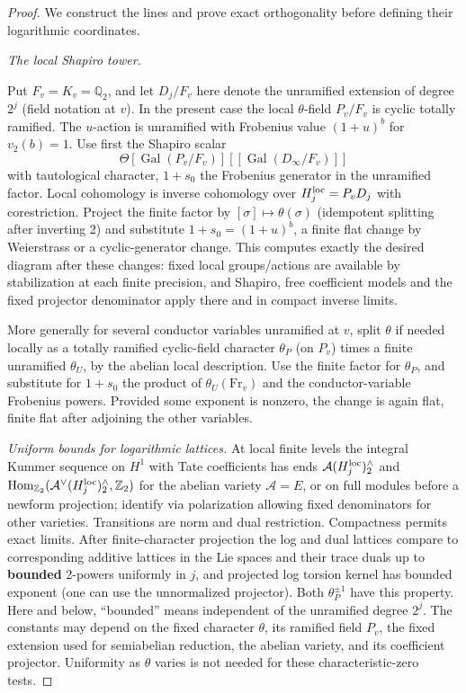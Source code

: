 \begin{proof}
We construct the lines and prove exact orthogonality before defining their logarithmic coordinates.

\smallskip\noindent\emph{The local Shapiro tower.}

Put \(F_v=K_v=\mathbb Q_2\), and let \(D_j/F_v\) here denote the unramified extension of degree \(2^j\) (field notation at \(v\)). In the present case the local \(\theta\)-field \(P_v/F_v\) is cyclic totally ramified. The \(u\)-action is unramified with Frobenius value \((1+u)^b\) for \(v_2(b)=1\). Use first the Shapiro scalar
\[
          \Theta[\operatorname{Gal}(P_v/F_v)]
                        [[\operatorname{Gal}(D_\infty/F_v)]]
\]
with tautological character, \(1+s_0\) the Frobenius generator in the unramified factor. Local cohomology is inverse cohomology over \(H_j^{\rm loc}=P_vD_j\) with corestriction. Project the finite factor by \([\sigma]\mapsto\theta(\sigma)\) (idempotent splitting after inverting 2) and substitute \(1+s_0=(1+u)^b\), a finite flat change by Weierstrass or a cyclic-generator change. This computes exactly the desired diagram after these changes: fixed local groups/actions are available by stabilization at each finite precision, and Shapiro, free coefficient models and the fixed projector denominator apply there and in compact inverse limits.

More generally for several conductor variables unramified at \(v\), split \(\theta\) if needed locally as a totally ramified cyclic-field character \(\theta_P\) (on \(P_v\)) times a finite unramified \(\theta_U\), by the abelian local description. Use the finite factor for \(\theta_P\), and substitute for \(1+s_0\) the product of \(\theta_U(\mathrm{Fr}_v)\) and the conductor-variable Frobenius powers. Provided some exponent is nonzero, the change is again flat, finite flat after adjoining the other variables.

\smallskip\noindent\emph{Uniform bounds for logarithmic lattices.}
At local finite levels the integral Kummer sequence on \(H^1\) with Tate coefficients has ends \(\mathcal A(H_j^{\rm loc})^\wedge_2\) and \(\operatorname{Hom}_{\mathbb Z_2}(\mathcal A^\vee(H_j^{\rm loc})^\wedge_2,\mathbb Z_2)\) for the abelian variety \(\mathcal A=E\), or on full modules before a newform projection; identify via polarization allowing fixed denominators for other varieties. Transitions are norm and dual restriction. Compactness permits exact limits. After finite-character projection the log and dual lattices compare to corresponding additive lattices in the Lie spaces and their trace duals up to \textbf{bounded} 2-powers uniformly in \(j\), and projected log torsion kernel has bounded exponent (one can use the unnormalized projector). Both \(\theta_P^{\pm1}\) have this property. Here and below, ``bounded'' means independent of the unramified degree \(2^j\). The constants may depend on the fixed character \(\theta\), its ramified field \(P_v\), the fixed extension used for semiabelian reduction, the abelian variety, and its coefficient projector. Uniformity as \(\theta\) varies is not needed for these characteristic-zero tests.


\end{proof}
